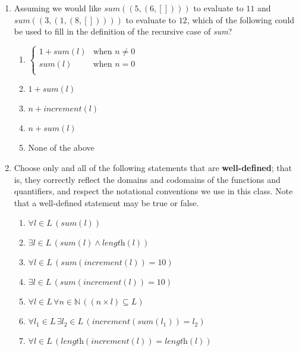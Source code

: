 \documentclass[12pt, oneside]{article}
\begin{document}
\begin{enumerate}
\begin{enumerate}
    \item Assuming we would like $sum((5, (6, [])))$ to evaluate to $11$ and $sum((3, (1, (8, []))))$ to evaluate to $12$, which of the following could be used to fill in the definition of the recursive case of \textit{sum}?
    
     \begin{multicols}{2}
    \begin{enumerate}
        \item $\begin{cases}
            1 + \textit{sum}(l) & \textrm{when } n \neq 0 \\
            \textit{sum}(l) & \textrm{when } n = 0 \\
        \end{cases}$
        \item $1 + \textit{sum}(l)$
        \item $n + \textit{increment}(l)$
        \item $n + \textit{sum}(l)$
        \item None of the above
    \end{enumerate}
    \end{multicols}
    
    \item Choose only and all of the following statements that are \textbf{well-defined}; that is, they correctly reflect the domains and codomains of the functions and quantifiers, and respect the notational conventions we use in this class. Note that a well-defined statement may be true or false.

    \begin{multicols}{2}    
    \begin{enumerate}
        \item $\forall l \in L \, (\textit{sum}(l))$
        \item $\exists l \in L \, (\textit{sum}(l) \land \textit{length}(l))$
        \item $\forall l \in L \, (\textit{sum}(\textit{increment}(l)) = 10)$
        \item $\exists l \in L \, (\textit{sum}(\textit{increment}(l)) = 10)$
        \item $\forall l \in L \, \forall n \in \mathbb{N} \, ((n \times l) \subseteq L)$
        \item $\forall l_1 \in L \, \exists l_2 \in L \, (\textit{increment}(\textit{sum}(l_1)) = l_2)$
        \item $\forall l \in L \, (\textit{length}(\textit{increment}(l)) = \textit{length}(l))$
    \end{enumerate}
    \end{multicols}
    

\end{enumerate}
\end{enumerate}
\end{document}
